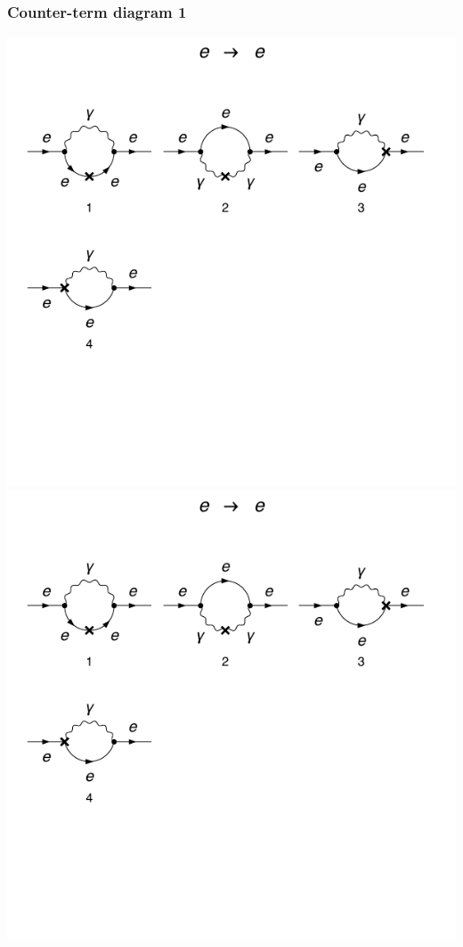 \documentclass[11pt]{article}
\begin{document}
\subsubsection{Counter-term diagram 1}
\noindent\begin{minipage}{0.3\textwidth}
\begin{center}
\includegraphics{QED_F_2loop_1c.pdf}
\includegraphics{QED_F_2loop_2c.pdf}
\end{center}
\end{minipage}
\end{document}
